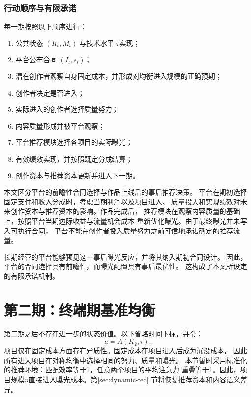 \documentclass[UTF8, a4paper, 12pt, fontset=fandol]{ctexart}
\theoremstyle{definition}
\theoremstyle{remark}
\begin{document}
\subsubsection{行动顺序与有限承诺}
每一期按照以下顺序进行：
\begin{enumerate}
  \item 公共状态 $(K_t,M_t)$ 与技术水平 $\tau$实现；
  \item 平台公布合同 $(I_t,s_t)$；
  \item 潜在创作者观察自身固定成本，并形成对均衡进入规模的正确预期；
  \item 创作者决定是否进入；
  \item 实际进入的创作者选择质量努力；
  \item 内容质量形成并被平台观察；
  \item 平台推荐模块选择各项目的实际曝光；
  \item 有效绩效实现，并按照既定分成结算；
  \item 创作资本与推荐资本更新并进入下一期。
\end{enumerate}
本文区分平台的前瞻性合同选择与作品上线后的事后推荐决策。
平台在期初选择固定支付和收入分成时，考虑当期利润以及项目进入、
质量投入和实现绩效对未来创作资本与推荐资本的影响。作品完成后，
推荐模块在观察内容质量的基础上，按照平台当期边际收益与流量机会成本
重新优化曝光。由于最终曝光并未写入可执行合同，
平台不能在创作者投入质量努力之前可信地承诺确定的推荐流量。

长期经营的平台能够预见这一事后曝光反应，并将其纳入期初合同设计。
因此，平台的合同选择具有前瞻性，而曝光配置具有事后最优性。
这构成了本文所设定的有限承诺机制。
\section{第二期：终端期基准均衡}
\label{sec:terminal}
第二期之后不存在进一步的状态价值。以下省略时间下标，并令：
\begin{equation*}
  a = A (K_2,\tau).
\end{equation*}
项目仅在固定成本方面存在异质性。固定成本在项目进入后成为沉没成本，
因此所有进入项目在对称均衡中选择相同的努力、质量和曝光。
本节暂时采用标准化的推荐环境：匹配效率等于1，任意两个项目的平均注意力
重叠等于1。因此，项目规模$n$直接进入曝光成本。第\ref{sec:dynamic-rec}
节将恢复推荐资本和内容语义差异。
\end{document}
